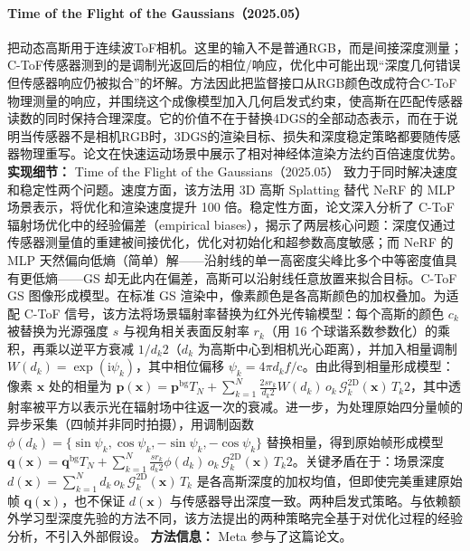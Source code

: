 \paragraph{Time of the Flight of the Gaussians（2025.05）\cite{2505_05356}}
把动态高斯用于连续波ToF相机。这里的输入不是普通RGB，而是间接深度测量；C-ToF传感器测到的是调制光返回后的相位/响应，优化中可能出现“深度几何错误但传感器响应仍被拟合”的坏解。方法因此把监督接口从RGB颜色改成符合C-ToF物理测量的响应，并围绕这个成像模型加入几何启发式约束，使高斯在匹配传感器读数的同时保持合理深度。它的价值不在于替换4DGS的全部动态表示，而在于说明当传感器不是相机RGB时，3DGS的渲染目标、损失和深度稳定策略都要随传感器物理重写。论文在快速运动场景中展示了相对神经体渲染方法约百倍速度优势。
\textbf{实现细节：} Time of the Flight of the Gaussians（2025.05） 致力于同时解决速度和稳定性两个问题。速度方面，该方法用 3D 高斯 Splatting 替代 NeRF 的 MLP 场景表示，将优化和渲染速度提升 100 倍。稳定性方面，论文深入分析了 C-ToF 辐射场优化中的经验偏差（empirical biases），揭示了两层核心问题：深度仅通过传感器测量值的重建被间接优化，优化对初始化和超参数高度敏感；而 NeRF 的 MLP 天然偏向低熵（简单）解——沿射线的单一高密度尖峰比多个中等密度值具有更低熵——GS 却无此内在偏差，高斯可以沿射线任意放置来拟合目标。C-ToF GS 图像形成模型。在标准 GS 渲染中，像素颜色是各高斯颜色的加权叠加。为适配 C-ToF 信号，该方法将场景辐射率替换为红外光传输模型：每个高斯的颜色 $c_k$ 被替换为光源强度 $s$ 与视角相关表面反射率 $r_k$（用 16 个球谐系数参数化）的乘积，再乘以逆平方衰减 $1/d_k^{}2$（$d_k$ 为高斯中心到相机光心距离），并加入相量调制 $W(d_k) = \exp(\mathrm{i}\psi_k)$，其中相位偏移 $\psi_k = 4\pi d_k f / \mathrm{c}$。由此得到相量形成模型：像素 $\mathbf{x}$ 处的相量为 $\mathbf{p}(\mathbf{x}) = \mathbf{p}^{\mathrm{bg}} T_N + \sum_{k=1}^{N}\frac{2sr_k}{d_k^{}2}W(d_k)\,o_k\,\mathcal{G}^{\mathrm{2D}}_k(\mathbf{x})\,T_k^{}2$，其中透射率被平方以表示光在辐射场中往返一次的衰减。进一步，为处理原始四分量帧的异步采集（四帧并非同时拍摄），用调制函数 $\phi(d_k) = \{\sin\psi_k, \cos\psi_k, -\sin\psi_k, -\cos\psi_k\}$ 替换相量，得到原始帧形成模型 $\mathbf{q}(\mathbf{x}) = \mathbf{q}^{\mathrm{bg}} T_N + \sum_{k=1}^{N}\frac{sr_k}{d_k^{}2}\phi(d_k)\,o_k\,\mathcal{G}^{\mathrm{2D}}_k(\mathbf{x})\,T_k^{}2$。关键矛盾在于：场景深度 $d(\mathbf{x}) = \sum_{k=1}^{N}d_k\,o_k\,\mathcal{G}^{\mathrm{2D}}_k(\mathbf{x})\,T_k$ 是各高斯深度的加权均值，但即使完美重建原始帧 $\mathbf{q}(\mathbf{x})$，也不保证 $d(\mathbf{x})$ 与传感器导出深度一致。两种启发式策略。与依赖额外学习型深度先验的方法不同，该方法提出的两种策略完全基于对优化过程的经验分析，不引入外部假设。
\textbf{方法信息：} Meta 参与了这篇论文。
